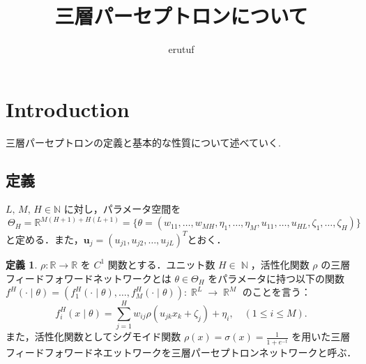 \documentclass{jsarticle}
\title{三層パーセプトロンについて}
\author{erutuf}
\DeclareMathOperator{\R}{\mathbb{R}}
\DeclareMathOperator{\N}{\mathbb{N}}
\theoremstyle{definition}
\newtheorem{defn}[thm]{定義}
\begin{document}
\maketitle

\section{Introduction}

三層パーセプトロンの定義と基本的な性質について述べていく.


\subsection{定義}

$L,\,M,\,H\in\mathbb{N}$ に対し，パラメータ空間を
\[
  \ \Theta_H=\mathbb{R}^{M(H+1)+H(L+1)}=\{\theta=(w_{11},\ldots,w_{MH},\eta_{1},\ldots,\eta_{M},u_{11},\ldots,u_{HL},\zeta_{1},\ldots,\zeta_{H})\}
\]
と定める．また，$\mathbf{u}_{j}=(u_{j1},u_{j2},\ldots,u_{jL})^{T}$とおく．

\begin{defn}
  $\rho : \mathbb{R}\rightarrow \mathbb{R}$ を $C^1$ 関数とする．ユニット数 $H \in \N$，活性化関数 $\rho$ の三層フィードフォワードネットワークとは $\theta \in \Theta_H$ をパラメータに持つ以下の関数 $f^H(\cdot \mid \theta) = (f_1^H(\cdot \mid \theta), \ldots, f_M^H(\cdot \mid \theta)): \R^L \rightarrow \R^M$ のことを言う：
\begin{equation*}
  f_i^H(x \mid \theta) = \sum_{j=1}^H w_{ij}\rho\left(u_{jk}x_k + \zeta_j\right) + \eta_i, \quad (1 \le i \le M).
\end{equation*}
また，活性化関数としてシグモイド関数 $\rho(x) = \sigma(x) = \frac{1}{1+e^{-t}}$ を用いた三層フィードフォワードネエットワークを三層パーセプトロンネットワークと呼ぶ．
\end{defn}
\end{document}
